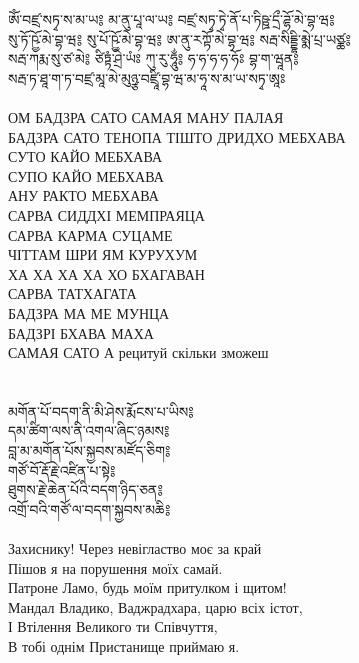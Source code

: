 \ru
\newpage
\ti
ཨོཾ་བཛྲ་སཏྭ་ས་མ་ཡ༔ མ་ནུ་པཱ་ལ་ཡ༔ བཛྲ་སཏྭ་ཏྭེ་ནོ་པ་ཏིཥྛ་དྲྀ་ཌྷོ་མེ་བྷ་ཝ༔ \\
སུ་ཏོ་ཥྱོ་མེ་བྷ་ཝ༔ སུ་པོ་ཥྱོ་མེ་བྷ་ཝ༔ ཨ་ནུ་རཀྟོ་མེ་བྷ་ཝ༔ སརྦ་སིདྡྷི་མྨེ་པྲ་ཡཙྪ༔ \\
སརྦ་ཀརྨ་སུ་ཙ་མེ༔ ཙིཏྟཾ་ཤྲེ་ཡཾཿ ཀུ་རུ་ཧཱུྂ༔ ཧ་ཧ་ཧ་ཧ་ཧོཿ བྷ་ག་ཝཱན༔ \\
སརྦ་ཏ་ཐཱ་ག་ཏ་བཛྲ་མཱ་མེ་མུཉྩ་བཛྲཱི་བྷ་ཝ་མ་ཧཱ་ས་མ་ཡ་སཏྭ་ཨཱཿ\\
\\
\ru
ОМ БАДЗРА САТО САМАЯ МАНУ ПАЛАЯ\\
БАДЗРА САТО ТЕНОПА ТІШТО ДРИДХО МЕБХАВА\\
СУТО КАЙО МЕБХАВА\\
СУПО КАЙО МЕБХАВА\\
АНУ РАКТО МЕБХАВА\\
САРВА СИДДХІ МЕМПРАЯЦА\\
САРВА КАРМА СУЦАМЕ\\
ЧІТТАМ ШРИ ЯМ КУРУХУМ\\
ХА ХА ХА ХА ХО БХАГАВАН\\
САРВА ТАТХАГАТА\\
БАДЗРА МА МЕ МУНЦА\\
БАДЗРІ БХАВА МАХА\\
САМАЯ САТО А \hspace{2cm} \scriptsize рецитуй скільки зможеш \normalsize \\
\\
\\
\ti
མགོན་པོ་བདག་ནི་མི་ཤེས་རྨོངས་པ་ཡིས༔\\
དམ་ཚིག་ལས་ནི་འགལ་ཞིང་ཉམས༔ \\
བླ་མ་མགོན་པོས་སྐྱབས་མཛོད་ཅིག༔ \\
གཙོ་བོ་རྡོ་རྗེ་འཛིན་པ་སྟེ༔ \\
ཐུགས་རྗེ་ཆེན་པོའི་བདག་ཉིད་ཅན༔ \\
འགྲོ་བའི་གཙོ་ལ་བདག་སྐྱབས་མཆི༔\\
\\
\ru
Захиснику! Через невігластво моє за край\\
Пішов я на порушення моїх самай.\\
Патроне Ламо, будь моїм притулком і щитом!\\
Мандал Владико, Ваджрадхара, царю всіх істот,\\
І Втілення Великого ти Співчуття,\\
В тобі однім Пристанище приймаю я.

